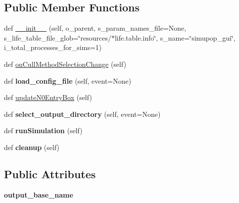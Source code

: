 \subsection*{Public Member Functions}
\begin{DoxyCompactItemize}
\item 
def \hyperlink{classnegui_1_1pgguisimupop_1_1PGGuiSimuPop_aa159ead5d8fbd28d693c9021db12b95e}{\+\_\+\+\_\+init\+\_\+\+\_\+} (self, o\+\_\+parent, s\+\_\+param\+\_\+names\+\_\+file=None, s\+\_\+life\+\_\+table\+\_\+file\+\_\+glob=\char`\"{}resources/$\ast$life.\+table.\+info\char`\"{}, s\+\_\+name=\char`\"{}simupop\+\_\+gui\char`\"{}, i\+\_\+total\+\_\+processes\+\_\+for\+\_\+sims=1)
\item 
def \hyperlink{classnegui_1_1pgguisimupop_1_1PGGuiSimuPop_ad1d590f23bbaf0eda730d488ea74c1ba}{on\+Cull\+Method\+Selection\+Change} (self)
\item 
def {\bfseries load\+\_\+config\+\_\+file} (self, event=None)\hypertarget{classnegui_1_1pgguisimupop_1_1PGGuiSimuPop_a9ae755614518ece6584d83aff129f4d5}{}\label{classnegui_1_1pgguisimupop_1_1PGGuiSimuPop_a9ae755614518ece6584d83aff129f4d5}

\item 
def \hyperlink{classnegui_1_1pgguisimupop_1_1PGGuiSimuPop_ac193cf44f5e4f1e5b146a43e9563d7b0}{update\+N0\+Entry\+Box} (self)
\item 
def {\bfseries select\+\_\+output\+\_\+directory} (self, event=None)\hypertarget{classnegui_1_1pgguisimupop_1_1PGGuiSimuPop_a4d88e502ff12249698177dbb4336715d}{}\label{classnegui_1_1pgguisimupop_1_1PGGuiSimuPop_a4d88e502ff12249698177dbb4336715d}

\item 
def {\bfseries run\+Simulation} (self)\hypertarget{classnegui_1_1pgguisimupop_1_1PGGuiSimuPop_a7dc99019295f2a2650fa95ecddd55239}{}\label{classnegui_1_1pgguisimupop_1_1PGGuiSimuPop_a7dc99019295f2a2650fa95ecddd55239}

\item 
def {\bfseries cleanup} (self)\hypertarget{classnegui_1_1pgguisimupop_1_1PGGuiSimuPop_a24642a8bffa19a61a4fb1b6d5e9f0a1c}{}\label{classnegui_1_1pgguisimupop_1_1PGGuiSimuPop_a24642a8bffa19a61a4fb1b6d5e9f0a1c}

\end{DoxyCompactItemize}
\subsection*{Public Attributes}
\begin{DoxyCompactItemize}
\item 
{\bfseries output\+\_\+base\+\_\+name}\hypertarget{classnegui_1_1pgguisimupop_1_1PGGuiSimuPop_aa5f9f17f0527c20e5556b574a3f97300}{}\label{classnegui_1_1pgguisimupop_1_1PGGuiSimuPop_aa5f9f17f0527c20e5556b574a3f97300}

\end{DoxyCompactItemize}

